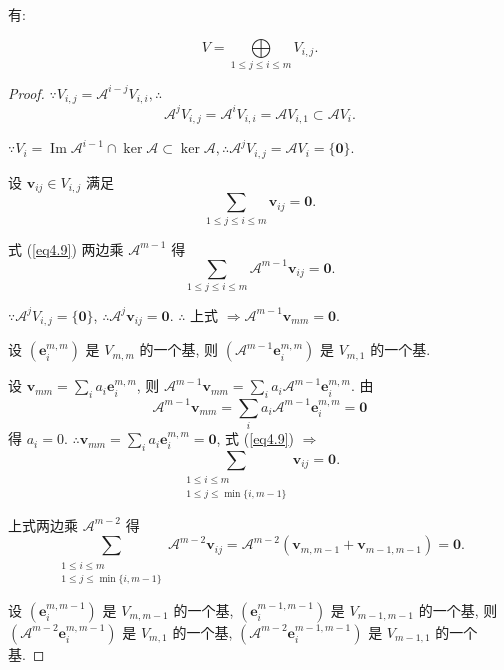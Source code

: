 \documentclass{ctexart}
\begin{document}
有:
\begin{theorem}\label{t4.3}
    \[V=\bigoplus\limits_{1\leq j\leq i\leq m}V_{i,j}.\]
\end{theorem}
\begin{proof}
    $\because V_{i,j}=\mathcal{A}^{i-j}V_{i,i},\therefore$
    \[\mathcal{A}^jV_{i,j}=\mathcal{A}^iV_{i,i}=\mathcal{A}V_{i,1}\subset\mathcal{A}V_i.\]

    $\because V_i=\operatorname{Im}\mathcal{A}^{i-1}\cap\ker\mathcal{A}\subset\ker\mathcal{A},\therefore\mathcal{A}^jV_{i,j}=\mathcal{A}V_i=\{\boldsymbol{0}\}$.

    设 $\boldsymbol{v}_{ij}\in V_{i,j}$ 满足
    \begin{equation}\label{eq4.9}
        \sum\limits_{1\leq j\leq i\leq m}\boldsymbol{v}_{ij}=\boldsymbol{0}.
    \end{equation}

    式 (\ref{eq4.9}) 两边乘 $\mathcal{A}^{m-1}$ 得
    \[\sum\limits_{1\leq j\leq i\leq m}\mathcal{A}^{m-1}\boldsymbol{v}_{ij}=\boldsymbol{0}.\]

    $\because\mathcal{A}^jV_{i,j}=\{\boldsymbol{0}\}$, $\therefore\mathcal{A}^j\boldsymbol{v}_{ij}=\boldsymbol{0}$. $\therefore$ 上式 $\Rightarrow\mathcal{A}^{m-1}\boldsymbol{v}_{mm}=\boldsymbol{0}$.

    设 $(\boldsymbol{e}_i^{m,m})$ 是 $V_{m,m}$ 的一个基, 则 $(\mathcal{A}^{m-1}\boldsymbol{e}_i^{m,m})$ 是 $V_{m,1}$ 的一个基.
    
    设 $\boldsymbol{v}_{mm}=\sum\limits_ia_i\boldsymbol{e}_i^{m,m}$, 则 $\mathcal{A}^{m-1}\boldsymbol{v}_{mm}=\sum\limits_ia_i\mathcal{A}^{m-1}\boldsymbol{e}_i^{m,m}$. 由
    \[\mathcal{A}^{m-1}\boldsymbol{v}_{mm}=\sum\limits_ia_i\mathcal{A}^{m-1}\boldsymbol{e}_i^{m,m}=\boldsymbol{0}\]
    得 $a_i=0$. $\therefore \boldsymbol{v}_{mm}=\sum\limits_ia_i\boldsymbol{e}_i^{m,m}=\boldsymbol{0}$, 式 (\ref{eq4.9}) $\Rightarrow$
    \[\sum\limits_{\substack{1\leq i\leq m\\1\leq j\leq\min\{i,m-1\}}}\boldsymbol{v}_{ij}=\boldsymbol{0}.\]
    
    上式两边乘 $\mathcal{A}^{m-2}$ 得
    \[\sum\limits_{\substack{1\leq i\leq m\\1\leq j\leq\min\{i,m-1\}}}\mathcal{A}^{m-2}\boldsymbol{v}_{ij}=\mathcal{A}^{m-2}(\boldsymbol{v}_{m,m-1}+\boldsymbol{v}_{m-1,m-1})=\boldsymbol{0}.\]

    设 $(\boldsymbol{e}_i^{m,m-1})$ 是 $V_{m,m-1}$ 的一个基, $(\boldsymbol{e}_i^{m-1,m-1})$ 是 $V_{m-1,m-1}$ 的一个基, 则 $(\mathcal{A}^{m-2}\boldsymbol{e}_i^{m,m-1})$ 是 $V_{m,1}$ 的一个基, $(\mathcal{A}^{m-2}\boldsymbol{e}_i^{m-1,m-1})$ 是 $V_{m-1,1}$ 的一个基.


\end{proof}
\end{document}
